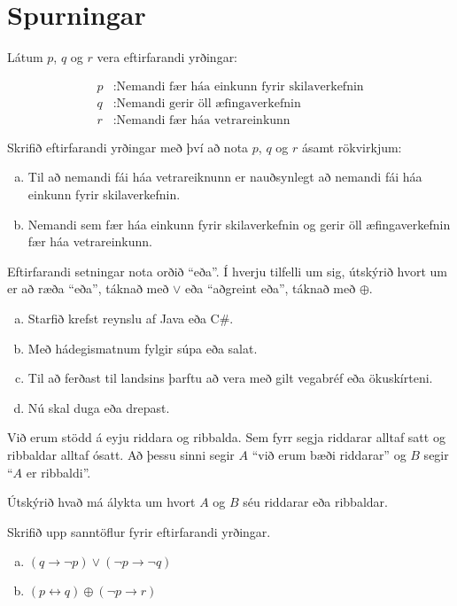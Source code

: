 \documentclass{exam}
\begin{document}
\section{Spurningar}
\begin{questions}
\question Látum $p$, $q$ og $r$ vera eftirfarandi yrðingar:

\begin{align*}
p &: \text{Nemandi fær háa einkunn fyrir skilaverkefnin}\\
q &: \text{Nemandi gerir öll æfingaverkefnin}\\
r &: \text{Nemandi fær háa vetrareinkunn}
\end{align*}

Skrifið eftirfarandi yrðingar með því að nota $p$, $q$ og $r$ ásamt rökvirkjum:

\begin{enumerate}[a)]
 \item Til að nemandi fái háa vetrareiknunn er nauðsynlegt að nemandi fái háa einkunn fyrir skilaverkefnin.
 \item Nemandi sem fær háa einkunn fyrir skilaverkefnin og gerir öll æfingaverkefnin fær háa vetrareinkunn.
\end{enumerate}

\question Eftirfarandi setningar nota orðið ``eða''. Í hverju tilfelli um sig, útskýrið hvort um er að ræða ``eða'', táknað með $\lor$ eða ``aðgreint eða'', táknað með $\oplus$.

\begin{enumerate}[a)]
 \item Starfið krefst reynslu af Java eða C\#.
 \item Með hádegismatnum fylgir súpa eða salat.
 \item Til að ferðast til landsins þarftu að vera með gilt vegabréf eða ökuskírteni.
 \item Nú skal duga eða drepast.
\end{enumerate}

\question Við erum stödd á eyju riddara og ribbalda. Sem fyrr segja riddarar alltaf satt og ribbaldar alltaf ósatt. Að þessu sinni segir $A$ ``við erum bæði riddarar'' og $B$ segir ``$A$ er ribbaldi''.

Útskýrið hvað má álykta um hvort $A$ og $B$ séu riddarar eða ribbaldar.

\newpage

\question Skrifið upp sanntöflur fyrir eftirfarandi yrðingar.
\begin{enumerate}[a)]
\item $(q \rightarrow \lnot p) \lor (\lnot p \rightarrow \lnot q)$
\item $(p \leftrightarrow q) \oplus (\lnot p \rightarrow r)$
\end{enumerate}


\end{questions}
\end{document}
